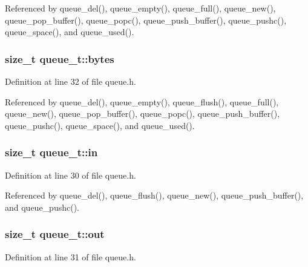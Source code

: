 Referenced by queue\-\_\-del(), queue\-\_\-empty(), queue\-\_\-full(), queue\-\_\-new(), queue\-\_\-pop\-\_\-buffer(), queue\-\_\-popc(), queue\-\_\-push\-\_\-buffer(), queue\-\_\-pushc(), queue\-\_\-space(), and queue\-\_\-used().

\hypertarget{structqueue__t_a58398d4ee60bc90ffba2bc3488fe185b}{
\subsubsection[{bytes}]{\setlength{\rightskip}{0pt plus 5cm}size\-\_\-t queue\-\_\-t\-::bytes}}\label{structqueue__t_a58398d4ee60bc90ffba2bc3488fe185b}


Definition at line 32 of file queue.\-h.



Referenced by queue\-\_\-del(), queue\-\_\-empty(), queue\-\_\-flush(), queue\-\_\-full(), queue\-\_\-new(), queue\-\_\-pop\-\_\-buffer(), queue\-\_\-popc(), queue\-\_\-push\-\_\-buffer(), queue\-\_\-pushc(), queue\-\_\-space(), and queue\-\_\-used().

\hypertarget{structqueue__t_a7a6832e36c70a1db7fddc93fb6be9d63}{
\subsubsection[{in}]{\setlength{\rightskip}{0pt plus 5cm}size\-\_\-t queue\-\_\-t\-::in}}\label{structqueue__t_a7a6832e36c70a1db7fddc93fb6be9d63}


Definition at line 30 of file queue.\-h.



Referenced by queue\-\_\-del(), queue\-\_\-flush(), queue\-\_\-new(), queue\-\_\-push\-\_\-buffer(), and queue\-\_\-pushc().

\hypertarget{structqueue__t_a8f6e1c623d2ceed398a71a0aab93b0fa}{
\subsubsection[{out}]{\setlength{\rightskip}{0pt plus 5cm}size\-\_\-t queue\-\_\-t\-::out}}\label{structqueue__t_a8f6e1c623d2ceed398a71a0aab93b0fa}


Definition at line 31 of file queue.\-h.



